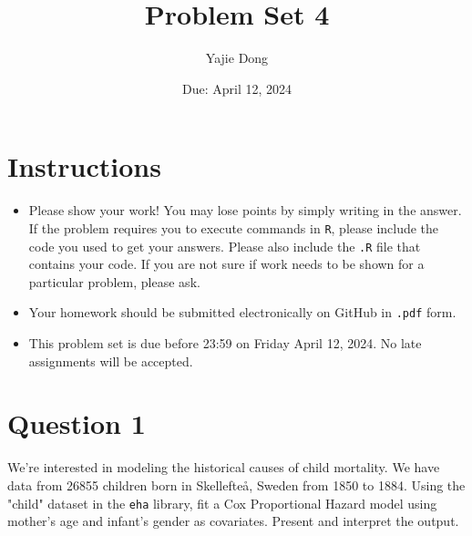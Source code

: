 \documentclass[12pt,letterpaper]{article}
\title{Problem Set 4}
\date{Due: April 12, 2024}
\author{Yajie Dong}
\begin{document}
	\maketitle
	\section*{Instructions}
	\begin{itemize}
	\item Please show your work! You may lose points by simply writing in the answer. If the problem requires you to execute commands in \texttt{R}, please include the code you used to get your answers. Please also include the \texttt{.R} file that contains your code. If you are not sure if work needs to be shown for a particular problem, please ask.
	\item Your homework should be submitted electronically on GitHub in \texttt{.pdf} form.
	\item This problem set is due before 23:59 on Friday April 12, 2024. No late assignments will be accepted.

	\end{itemize}

	\vspace{.25cm}
\section*{Question 1}
\vspace{.25cm}
\noindent We're interested in modeling the historical causes of child mortality. We have data from 26855 children born in Skellefteå, Sweden from 1850 to 1884. Using the "child" dataset in the \texttt{eha} library, fit a Cox Proportional Hazard model using mother's age and infant's gender as covariates. Present and interpret the output.
\end{document}
